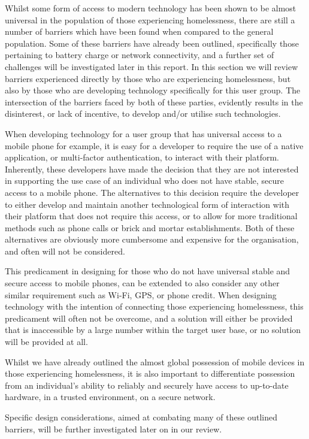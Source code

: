 Whilst some form of access to modern technology has been shown to be almost universal in the population of those experiencing homelessness, there are still a number of barriers which have been found when compared to the general population. Some of these barriers have already been outlined, specifically those pertaining to battery charge or network connectivity, and a further set of challenges will be investigated later in this report. In this section we will review barriers experienced directly by those who are experiencing homelessness, but also by those who are developing technology specifically for this user group. The intersection of the barriers faced by both of these parties, evidently results in the disinterest, or lack of incentive, to develop and/or utilise such technologies.

When developing technology for a user group that has universal access to a mobile phone for example, it is easy for a developer to require the use of a native application, or multi-factor authentication, to interact with their platform. Inherently, these developers have made the decision that they are not interested in supporting the use case of an individual who does not have stable, secure access to a mobile phone. The alternatives to this decision require the developer to either develop and maintain another technological form of interaction with their platform that does not require this access, or to allow for more traditional methods such as phone calls or brick and mortar establishments. Both of these alternatives are obviously more cumbersome and expensive for the organisation, and often will not be considered.

This predicament in designing for those who do not have universal stable and secure access to mobile phones, can be extended to also consider any other similar requirement such as Wi-Fi, GPS, or phone credit. When designing technology with the intention of connecting those experiencing homelessness, this predicament will often not be overcome, and a solution will either be provided that is inaccessible by a large number within the target user base, or no solution will be provided at all.

Whilst we have already outlined the almost global possession of mobile devices in those experiencing homelessness, it is also important to differentiate possession from an individual's ability to reliably and securely have access to up-to-date hardware, in a trusted environment, on a secure network.

Specific design considerations, aimed at combating many of these outlined barriers, will be further investigated later on in our review.

